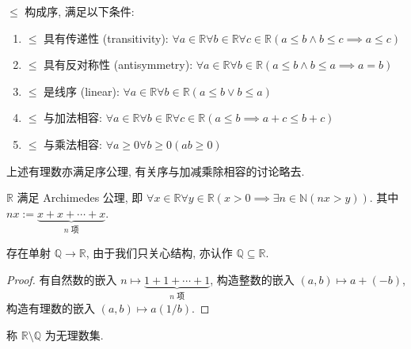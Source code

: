 \begin{axiom}[序公理]
    \label {axiom:real numbers axiom of order}
    \(\le\) 构成序, 满足以下条件:
    \begin{enumerate}
        \item \(\le\) 具有传递性 (transitivity): \(\forall a \in \mathbb{R} \forall b \in \mathbb{R} \forall c \in \mathbb{R} (a \le b \land b \le c \implies a \le c)\)
        \item \(\le\) 具有反对称性 (antisymmetry): \(\forall a \in \mathbb{R} \forall b \in \mathbb{R} (a \le b \land b \le a \implies a = b)\)
        \item \(\le\) 是线序 (linear): \(\forall a \in \mathbb{R} \forall b \in \mathbb{R} (a \le b \lor b \le a)\)
        \item \(\le\) 与加法相容: \(\forall a \in \mathbb{R} \forall b \in \mathbb{R} \forall c \in \mathbb{R} (a \le b \implies a + c \le b + c)\)
        \item \(\le\) 与乘法相容: \(\forall a \ge 0 \forall b \ge 0(ab \ge 0)\)
    \end{enumerate}
\end{axiom}

上述有理数亦满足序公理, 有关序与加减乘除相容的讨论略去.

\begin{axiom}[Achimedes 公理]
    \label {axiom:real numbers axiom of Archimedes}
    \(\mathbb{R}\) 满足 Archimedes 公理, 即 \(\forall x \in \mathbb{R} \forall y \in \mathbb{R} (x > 0 \implies \exists n \in \mathbb{N} (nx > y))\).
    其中 \(nx := \underbrace{x + x + \cdots + x}_{n \text{ 项}}\).
\end{axiom}

\begin{lemma}
    存在单射 \(\mathbb{Q} \to \mathbb{R}\), 由于我们只关心结构, 亦认作 \(\mathbb{Q} \subseteq \mathbb{R}\).

    \begin{proof}
        有自然数的嵌入 \(n \mapsto \underbrace{1 + 1 + \cdots + 1}_{n \text{ 项}}\),
        构造整数的嵌入 \((a,b) \mapsto a + (-b)\), 构造有理数的嵌入 \((a,b) \mapsto a (1 / b)\).
    \end{proof}
\end{lemma}

\begin{definition}
    称 \(\mathbb{R} \setminus \mathbb{Q}\) 为无理数集.
\end{definition}

